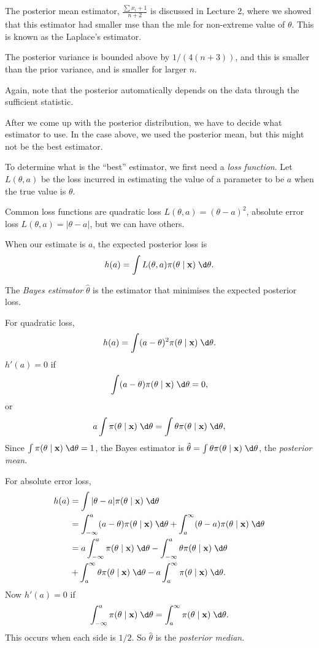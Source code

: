 \documentclass[a4paper]{article}
\begin{document}
The posterior mean estimator, $\frac{\sum x_i + 1}{n + 2}$ is discussed in Lecture 2, where we showed that this estimator had smaller mse than the mle for non-extreme value of $\theta$. This is known as the Laplace's estimator.

The posterior variance is bounded above by $1/(4(n + 3))$, and this is smaller than the prior variance, and is smaller for larger $n$.

Again, note that the posterior automatically depends on the data through the sufficient statistic.

After we come up with the posterior distribution, we have to decide what estimator to use. In the case above, we used the posterior mean, but this might not be the best estimator.

To determine what is the ``best'' estimator, we first need a \emph{loss function}. Let $L(\theta, a)$ be the loss incurred in estimating the value of a parameter to be $a$ when the true value is $\theta$.

Common loss functions are quadratic loss $L(\theta, a) = (\theta - a)^2$, absolute error loss $L(\theta, a) = |\theta - a|$, but we can have others.

When our estimate is $a$, the expected posterior loss is
\[
  h(a) = \int L(\theta, a)\pi(\theta\mid \mathbf{x})\;\d \theta.
\]
\begin{defi}
  The \emph{Bayes estimator} $\hat{\theta}$ is the estimator that minimises the expected posterior loss.
\end{defi}

For quadratic loss,
\[
  h(a) = \int (a - \theta)^2 \pi(\theta\mid \mathbf{x})\;\d \theta.
\]
$h'(a) = 0$ if
\[
  \int (a - \theta) \pi(\theta\mid \mathbf{x})\;\d \theta = 0,
\]
or
\[
  a \int \pi(\theta\mid \mathbf{x})\;\d \theta = \int \theta \pi(\theta\mid \mathbf{x})\;\d \theta,
\]
Since $\int \pi (\theta\mid \mathbf{x})\;\d \theta = 1$, the Bayes estimator is $\hat{\theta} = \int \theta\pi(\theta\mid \mathbf{x})\;\d \theta$, the \emph{posterior mean}.

For absolute error loss,
\begin{align*}
  h(a) &= \int |\theta - a|\pi(\theta\mid \mathbf{x})\;\d \theta\\
  &= \int_{-\infty}^a (a - \theta)\pi(\theta\mid \mathbf{x})\;\d \theta + \int_a^\infty (\theta - a)\pi(\theta\mid \mathbf{x})\;\d \theta\\
  &= a\int_{-\infty}^a \pi(\theta\mid \mathbf{x})\;\d \theta - \int_{-\infty}^a\theta\pi(\theta\mid \mathbf{x})\;\d \theta\\
  &+ \int_a^\infty \theta\pi(\theta\mid \mathbf{x})\;\d \theta - a\int_a^\infty \pi(\theta\mid \mathbf{x})\;\d \theta.
\end{align*}
Now $h'(a) = 0$ if
\[
  \int_{-\infty}^a \pi(\theta\mid \mathbf{x})\;\d \theta = \int_a^\infty \pi(\theta\mid \mathbf{x})\;\d \theta.
\]
This occurs when each side is $1/2$. So $\hat{\theta}$ is the \emph{posterior median}.
\end{document}

